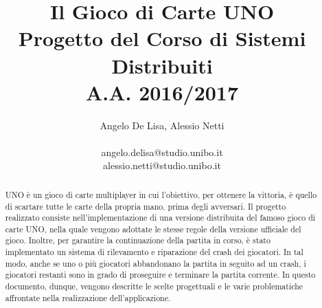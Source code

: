 \documentclass[11pt]{article} %
\title{Il Gioco di Carte UNO\\Progetto del Corso di Sistemi Distribuiti\\A.A. 2016/2017}
\author{Angelo De Lisa, Alessio Netti \\ \\ angelo.delisa@studio.unibo.it\\ alessio.netti@studio.unibo.it}
\date{} %
\begin{document}
\maketitle
\begin{otherlanguage}{english}
\begin{abstract}
UNO è un gioco di carte multiplayer in cui l'obiettivo, per ottenere la vittoria, è quello di scartare tutte le carte della propria mano, 
prima degli avversari. Il progetto realizzato consiste nell'implementazione di una versione distribuita del famoso gioco di carte UNO, nella quale vengono 
adottate le stesse regole della versione ufficiale del gioco.
Inoltre, per garantire la continuazione della partita in corso, è stato implementato un sistema di rilevamento e riparazione del crash dei giocatori. 
In tal modo, anche se uno o più giocatori abbandonano la partita in seguito ad un crash, i giocatori restanti sono in grado di proseguire e terminare 
la partita corrente. In questo documento, dunque, vengono descritte le scelte progettuali e le varie problematiche affrontate nella realizzazione dell'applicazione.
\end{abstract}
\end{otherlanguage}

\pagebreak

\tableofcontents

\pagebreak
\end{document}
